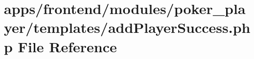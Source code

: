 \hypertarget{poker__player_2templates_2add_player_success_8php}{\section{apps/frontend/modules/poker\-\_\-player/templates/add\-Player\-Success.php File Reference}
\label{poker__player_2templates_2add_player_success_8php}
}
